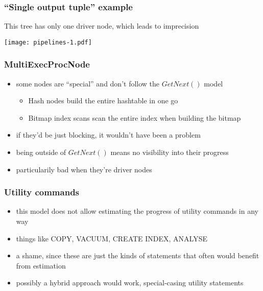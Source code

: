 \documentclass{beamer}
\begin{document}
\begin{frame}
  \frametitle{``Single output tuple'' example}

  This tree has only one driver node, which leads to imprecision
  \begin{center}
    \texttt{[image: pipelines-1.pdf]}
  \end{center}
\end{frame}

\begin{frame}
  \frametitle{MultiExecProcNode}

  \begin{itemize}
  \item some nodes are ``special'' and don't follow the $GetNext()$ model
    \begin{itemize}
    \item Hash nodes build the entire hashtable in one go
    \item Bitmap index scans scan the entire index when building the bitmap
    \end{itemize}
  \item if they'd be just blocking, it wouldn't have been a problem
  \item being outside of $GetNext()$ means no visibility into their progress
  \item particularily bad when they're driver nodes
  \end{itemize}
\end{frame}

\begin{frame}
  \frametitle{Utility commands}

  \begin{itemize}
  \item this model does not allow estimating the progress of utility commands
    in any way
  \item things like COPY, VACUUM, CREATE INDEX, ANALYSE
  \item a shame, since these are just the kinds of statements that often would
    benefit from estimation
  \item possibly a hybrid approach would work, special-casing utility
    statements
  \end{itemize}
\end{frame}
\end{document}
